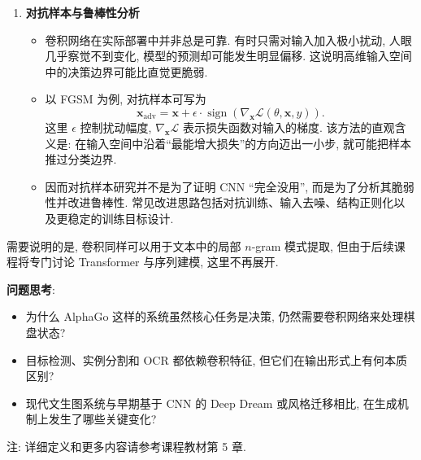 \documentclass{../nndlcourse}
\begin{document}
\begin{enumerate}
    \item \textbf{对抗样本与鲁棒性分析}
    \begin{itemize}
        \item 卷积网络在实际部署中并非总是可靠. 有时只需对输入加入极小扰动, 人眼几乎察觉不到变化, 模型的预测却可能发生明显偏移. 这说明高维输入空间中的决策边界可能比直觉更脆弱.
        \item 以 FGSM 为例, 对抗样本可写为
        \begin{equation*}
            \boldsymbol{x}_{\mathrm{adv}} = \boldsymbol{x} + \epsilon \cdot \operatorname{sign}\!\left(\nabla_{\boldsymbol{x}} \mathcal{L}(\theta, \boldsymbol{x}, y)\right).
        \end{equation*}
        这里 $\epsilon$ 控制扰动幅度, $\nabla_{\boldsymbol{x}} \mathcal{L}$ 表示损失函数对输入的梯度. 该方法的直观含义是: 在输入空间中沿着“最能增大损失”的方向迈出一小步, 就可能把样本推过分类边界.
        \item 因而对抗样本研究并不是为了证明 CNN “完全没用”, 而是为了分析其脆弱性并改进鲁棒性. 常见改进思路包括对抗训练、输入去噪、结构正则化以及更稳定的训练目标设计.
    \end{itemize}
\end{enumerate}

需要说明的是, 卷积同样可以用于文本中的局部 $n$-gram 模式提取, 但由于后续课程将专门讨论 Transformer 与序列建模, 这里不再展开.

\textbf{问题思考}:
\begin{itemize}
    \item 为什么 AlphaGo 这样的系统虽然核心任务是决策, 仍然需要卷积网络来处理棋盘状态?
    \item 目标检测、实例分割和 OCR 都依赖卷积特征, 但它们在输出形式上有何本质区别?
    \item 现代文生图系统与早期基于 CNN 的 Deep Dream 或风格迁移相比, 在生成机制上发生了哪些关键变化?
\end{itemize}

注: 详细定义和更多内容请参考课程教材第 5 章.
\end{document}

